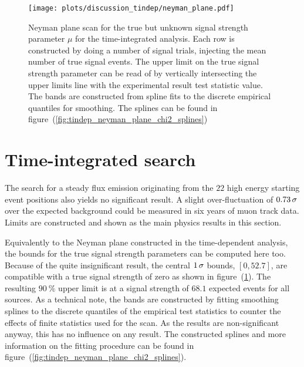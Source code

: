\begin{figure}[htpb]
  \centering
  \texttt{[image: plots/discussion\_tindep/neyman\_plane.pdf]}
  \caption[Neyman plane for the time-integrated analysis]{
    Neyman plane scan for the true but unknown signal strength parameter $\mu$ for the time-integrated analysis.
    Each row is constructed by doing a number of signal trials, injecting the mean number of true signal events.
    The upper limit on the true signal strength parameter can be read of by vertically intersecting the upper limits line with the experimental result test statistic value.
    The bands are constructed from spline fits to the discrete empirical quantiles for smoothing.
    The splines can be found in figure~(\ref{fig:tindep_neyman_plane_chi2_splines})
  }
  \label{fig:tindep_neyman_plane}
\end{figure}

\section*{Time-integrated search}
The search for a steady flux emission originating from the $\num{22}$ high energy starting event positions also yields no significant result.
A slight over-fluctuation of $\num{0.73}\,\sigma$ over the expected background could be measured in six years of muon track data.
Limits are constructed and shown as the main physics results in this section.

Equivalently to the Neyman plane constructed in the time-dependent analysis, the bounds for the true signal strength parameters can be computed here too.
Because of the quite insignificant result, the central $\num{1}\,\sigma$ bounds, $[0, 52.7]$, are compatible with a true signal strength of zero as shown in figure~(\ref{fig:tindep_neyman_plane}).
The resulting $\SI{90}{\percent}$ upper limit is at a signal strength of $68.1$ expected events for all sources.
As a technical note, the bands are constructed by fitting smoothing splines to the discrete quantiles of the empirical test statistics to counter the effects of finite statistics used for the scan.
As the results are non-significant anyway, this has no influence on any result.
The constructed splines and more information on the fitting procedure can be found in figure~(\ref{fig:tindep_neyman_plane_chi2_splines}).

